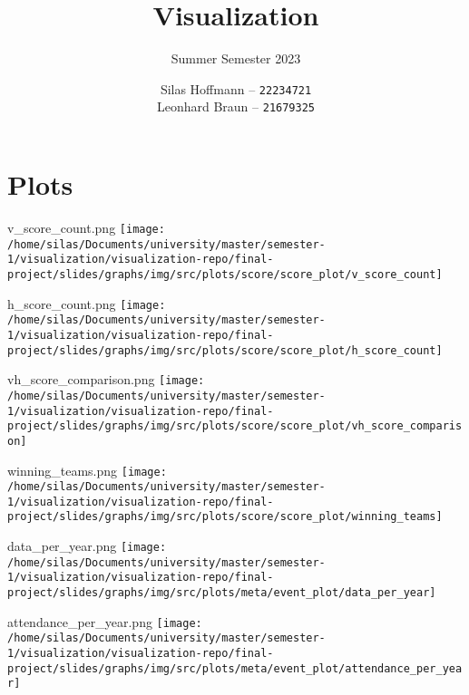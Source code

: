 \documentclass[pdf]{beamer}
\title{Visualization}
\subtitle{Summer Semester 2023}
\author{
    Silas Hoffmann --
    \texttt{22234721} \\
    Leonhard Braun --
    \texttt{21679325} \\
}
\institute{Georg-August-Universität Göttingen}
\begin{document}
\maketitle

\section{Plots}
\begin{frame}{v\_score\_count.png}
	\centering
	\texttt{[image: /home/silas/Documents/university/master/semester-1/visualization/visualization-repo/final-project/slides/graphs/img/src/plots/score/score\_plot/v\_score\_count]}
	
\end{frame}
\begin{frame}{h\_score\_count.png}
	\centering
	\texttt{[image: /home/silas/Documents/university/master/semester-1/visualization/visualization-repo/final-project/slides/graphs/img/src/plots/score/score\_plot/h\_score\_count]}
	
\end{frame}
\begin{frame}{vh\_score\_comparison.png}
	\centering
	\texttt{[image: /home/silas/Documents/university/master/semester-1/visualization/visualization-repo/final-project/slides/graphs/img/src/plots/score/score\_plot/vh\_score\_comparison]}
	
\end{frame}
\begin{frame}{winning\_teams.png}
	\centering
	\texttt{[image: /home/silas/Documents/university/master/semester-1/visualization/visualization-repo/final-project/slides/graphs/img/src/plots/score/score\_plot/winning\_teams]}
	
\end{frame}
\begin{frame}{data\_per\_year.png}
	\centering
	\texttt{[image: /home/silas/Documents/university/master/semester-1/visualization/visualization-repo/final-project/slides/graphs/img/src/plots/meta/event\_plot/data\_per\_year]}
	
\end{frame}
\begin{frame}{attendance\_per\_year.png}
	\centering
	\texttt{[image: /home/silas/Documents/university/master/semester-1/visualization/visualization-repo/final-project/slides/graphs/img/src/plots/meta/event\_plot/attendance\_per\_year]}
	
\end{frame}
\end{document}

